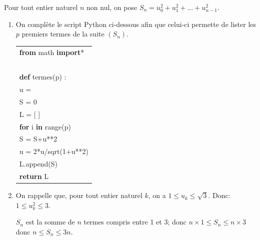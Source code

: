 \medskip

Pour tout entier naturel $n$ non nul, on pose $S_n = u_0^2 + u_1^2 + \ldots + u_{n-1}^2$.

\medskip

\begin{enumerate}
\item On complète le script Python ci-dessous afin que celui-ci permette de lister les $p$ premiers termes de la suite $(S_n)$.

\begin{center}
\begin{ttfamily}
\begin{tabular}{|l|}\hline
\textbf{from} math \textbf{import}*\\
~\\
\textbf{def} termes(p) :\\
\qquad  u = \blue 1\\
\qquad  S = 0\\
\qquad  L = [ ]\\
\qquad  \textbf{for} i \textbf{in} range(p)\\
\qquad \qquad S = \blue{}S+u**2\\
\qquad \qquad u = \blue{}2*u/sqrt(1+u**2)\\
\qquad \qquad L.append(S) \\
\qquad \textbf{return} L\\ \hline
\end{tabular}
\end{ttfamily}
\end{center}

%

\item On rappelle que, pour tout entier naturel $k$, on a $1 \leqslant u_k \leqslant \sqrt 3$. Donc: $1 \leqslant u_k^2 \leqslant 3$.

$S_n$ est la somme de $n$ termes compris entre 1 et 3; donc $n\times 1 \leqslant S_n \leqslant n\times 3$ donc $n \leqslant S_n \leqslant 3n$.



\end{enumerate}
